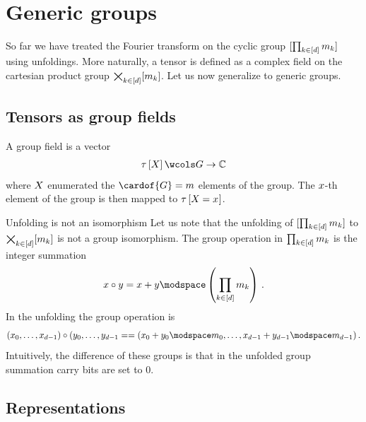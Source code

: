 \section{Generic groups}

So far we have treated the Fourier transform on the cyclic group $[\prod_{k\in[d]}m_{k}]$ using unfoldings.
More naturally, a tensor is defined as a complex field on the cartesian product group $\bigtimes_{k\in[d]}[m_{k}]$.
Let us now generalize to generic groups.

\subsection{Tensors as group fields}

A group field is a vector
\begin{align*}
    \hypercoreat{\catvariable} \wcols G \rightarrow \mathbb{C}
\end{align*}
where $X$ enumerated the $\cardof{G}=\catdim$ elements of the group.
The $x$-th element of the group is then mapped to $\tau\left[X_{}=x_{}\right]$.

\begin{example}{Unfolding is not an isomorphism}
    Let us note that the unfolding of $[\prod_{k\in[d]}m_{k}]$ to $\bigtimes_{k\in[d]}[m_{k}]$ is not a group isomorphism.
    The group operation in $\prod_{k\in[d]}m_{k}$ is the integer summation
    \begin{align*}
        \catindex \circ \seccatindex =
        \catindex + \seccatindex \modspace \left(\prod_{\catenumeratorin}\catdimof{\catenumerator}\right) \, .
    \end{align*}
    In the unfolding the group operation is
    \begin{align*}
        (\catindexof{0},\ldots,\catindexof{\catorder-1}) \circ (\seccatindexof{0},\ldots,\seccatindexof{\catorder-1}=
        = (\catindexof{0}+\seccatindexof{0}\modspace \catdimof{0},\ldots,\catindexof{\catorder-1}+\seccatindexof{\catorder-1}\modspace \catdimof{\catorder-1}) \, .
    \end{align*}
    Intuitively, the difference of these groups is that in the unfolded group summation carry bits are set to $0$.

\end{example}

\subsection{Representations}

